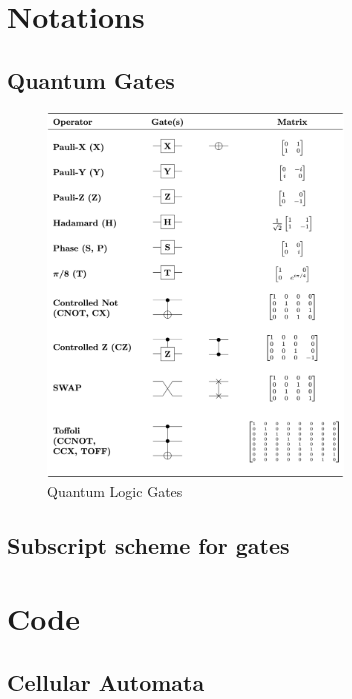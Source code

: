 \documentclass[11pt, oneside, listof=totoc]{scrbook}
\begin{document}
\appendix

\chapter{Notations}

\section{Quantum Gates}
\begin{figure}[H]
    \centering
    \includegraphics[width=0.7\textwidth]{Quantum_Logic_Gates.png}
    \caption{Quantum Logic Gates}
    \label{fig:quantum-logic-gates}
\end{figure} \noindent


\section{Subscript scheme for gates}

\chapter{Code}\label{appendix:code}

\section[Classical Cellular Automata]{Cellular Automata}

\end{document}
